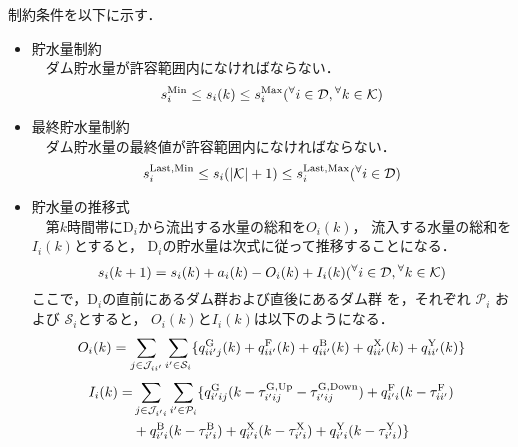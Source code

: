 制約条件を以下に示す．
%
	\begin{itemize}
%
	\item 貯水量制約 \\
	　ダム貯水量が許容範囲内になければならない．	
%
		\begin{equation}
			s_{i}^{\mathrm{Min}} \leq s_i(k) \leq s_{i}^{\mathrm{Max}} %
			\hfill ({}^{\forall} i \in \mathcal {D} , {}^{\forall} k \in \mathcal{K})
		\end{equation}
%
	\item 最終貯水量制約 \\
	　ダム貯水量の最終値が許容範囲内になければならない．
%
		\begin{equation}
			s_{i}^{\mathrm{Last,Min}} \leq s_{i}( |\mathcal{K}| + 1 ) %
			\leq s_{i}^{\mathrm{Last,Max}} %
			\hfill ({}^{\forall} i \in \mathcal {D} )
		\end{equation}
%
	\item 
		貯水量の推移式 \\
		　第$k$時間帯に$\mathrm D_i$から流出する水量の総和を$O_{i}(k)$，%
		流入する水量の総和を$I_{i}(k)$とすると，%
		$\mathrm D_i$の貯水量は次式に従って推移することになる．
%
		\begin{equation}
			s_i(k+1) = s_i(k) + a_i(k) - O_{i} (k) + I_{i} (k)
			\hfill ({}^{\forall} i \in \mathcal {D} , {}^{\forall} k \in \mathcal{K})
		\end{equation}		
%
		ここで，$\mathrm D_i$の直前にあるダム群および直後にあるダム群%
		を，それぞれ $\mathcal{P}_i$ および $\mathcal{S}_i$とすると，%
		$O_{i}(k)$と$I_{i}(k)$は以下のようになる．
%
		\begin{equation}
		\begin{split}
			O_{i}(k) = \sum_{ j \in \mathcal J_{ii'} } \sum_{ i' \in \mathcal S_i} 
			\{ q^{\rm G}_{ii'j} (k)  +q^{\rm F}_{ii'}(k) + q^{\rm B}_{ii'} (k) + q^{\rm X}_{ii'} (k)
			+ q^{\rm Y}_{ii'} (k) \} 
		\end{split}
		\end{equation}
%
		\begin{equation}
		\begin{split}
			I_{i}(k) = & \sum _{ j \in \mathcal{J}_{i'i} } \sum_{i' \in \mathcal P_i} 
		 	\{ q^{\rm G}_{i'ij} ( k- \tau_{i'ij}^{ \rm{G,Up} } - \tau_{i'ij}^{ \rm{G,Down} } )
		 	+ q^{\rm F}_{i'i} ( k- \tau_{ii'}^{ \rm F } ) \\
			&+ q^{\rm B}_{i'i} ( k - \tau_{i'i}^{ \rm B })
			+ q^{\rm X}_{i'i} ( k -\tau_{i'i}^{\rm X})
			+ q^{\rm Y}_{i'i} ( k -\tau_{i'i}^{\rm Y}) \} 
		\end{split}

\end{equation}
\end{itemize}
